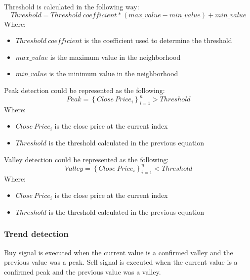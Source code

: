 \documentclass{imc-inf}
\begin{document}
	Threshold is calculated in the following way:
	\begin{equation}
		Threshold = Threshold\ coefficient * (max\_value - min\_value) + min\_value 
	\end{equation}
	Where:
	\begin{itemize}
		\item $Threshold\ coefficient$ is the coefficient used to determine the threshold
		\item $max\_value$ is the maximum value in the neighborhood
		\item $min\_value$ is the minimum value in the neighborhood
	\end{itemize}
	Peak detection could be represented as the following:
	\begin{equation}
		Peak = \left\{Close\ Price_{i}\right\}_{i=1}^{n} > Threshold
	\end{equation}
	Where:
	\begin{itemize}
		\item $Close\ Price_{i}$ is the close price at the current index
		\item $Threshold$ is the threshold calculated in the previous equation
	\end{itemize}
	Valley detection could be represented as the following:
	\begin{equation}
		Valley = \left\{Close\ Price_{i}\right\}_{i=1}^{n} < Threshold
	\end{equation}
	Where:
	\begin{itemize}
		\item $Close\ Price_{i}$ is the close price at the current index
		\item $Threshold$ is the threshold calculated in the previous equation
	\end{itemize}
	\subsubsection{Trend detection}
	Buy signal is executed when the current value is a confirmed valley and the previous value was a peak.
	Sell signal is executed when the current value is a confirmed peak and the previous value was a valley.
	
\end{document}
